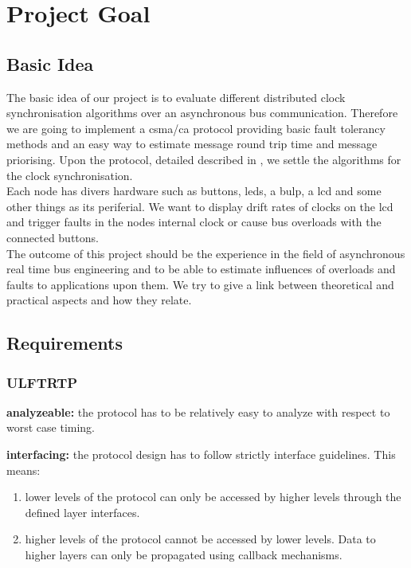 \section{Project Goal}

\subsection{Basic Idea}
The basic idea of our project is to evaluate different distributed clock synchronisation algorithms over an asynchronous bus communication. Therefore we are going to implement a csma/ca protocol providing basic fault tolerancy methods and an easy way to estimate message round trip time and message priorising.
Upon the protocol, detailed described in \cite[NESD1]{NESD1}, we settle the algorithms for the clock synchronisation.\\

Each node has divers hardware such as buttons, leds, a bulp, a lcd and some other things as its periferial. We want to display drift rates of clocks on the lcd and trigger faults in the nodes internal clock or cause bus overloads with the connected buttons.\\

The outcome of this project should be the experience in the field of asynchronous real time bus engineering and to be able to estimate influences of overloads and faults to applications upon them.
We try to give a link between theoretical and practical aspects and how they relate.

\subsection{Requirements}

\subsubsection{ULFTRTP}
\begin{req}
\label{req:ulftrtp:analyzeable}
\textbf{analyzeable: }the protocol has to be relatively easy to analyze with respect to worst case timing.
\end{req}

\begin{req}
\label{req:ulftrtp:interfacing}
\textbf{interfacing: }the protocol design has to follow strictly interface guidelines. This means:
\begin{enumerate}
 \item lower levels of the protocol can only be accessed by higher levels through the defined layer interfaces.
 \item higher levels of the protocol cannot be accessed by lower levels. Data to higher layers can only be propagated using callback mechanisms. 
\end{enumerate}

\end{req}

